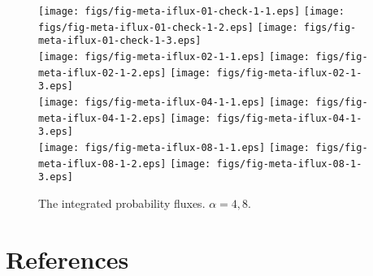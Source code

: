 \documentclass[aip,jcp,a4paper,reprint,onecolumn]{revtex4-1}
\begin{document}
\begin{figure}
  \centering
  \texttt{[image: figs/fig-meta-iflux-01-check-1-1.eps]}
  \texttt{[image: figs/fig-meta-iflux-01-check-1-2.eps]}
  \texttt{[image: figs/fig-meta-iflux-01-check-1-3.eps]}\\
  \texttt{[image: figs/fig-meta-iflux-02-1-1.eps]}
  \texttt{[image: figs/fig-meta-iflux-02-1-2.eps]}
  \texttt{[image: figs/fig-meta-iflux-02-1-3.eps]}\\
  \texttt{[image: figs/fig-meta-iflux-04-1-1.eps]}
  \texttt{[image: figs/fig-meta-iflux-04-1-2.eps]}
  \texttt{[image: figs/fig-meta-iflux-04-1-3.eps]}\\
  \texttt{[image: figs/fig-meta-iflux-08-1-1.eps]}
  \texttt{[image: figs/fig-meta-iflux-08-1-2.eps]}
  \texttt{[image: figs/fig-meta-iflux-08-1-3.eps]}
  \caption{The integrated probability fluxes. $\alpha = 4,8$.}
  \label{fig:tmp3}
\end{figure}



\section*{References}
{}

\end{document}
